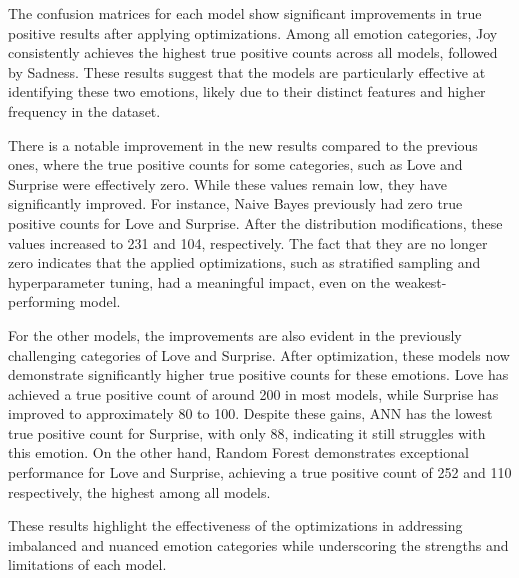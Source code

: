 The confusion matrices for each model show significant improvements in true positive results after applying optimizations. Among all emotion categories, Joy consistently achieves the highest true positive counts across all models, followed by Sadness. These results suggest that the models are particularly effective at identifying these two emotions, likely due to their distinct features and higher frequency in the dataset.

There is a notable improvement in the new results compared to the previous ones, where the true positive counts for some categories, such as Love and Surprise were effectively zero. While these values remain low, they have significantly improved. For instance, Naive Bayes previously had zero true positive counts for Love and Surprise. After the distribution modifications, these values increased to 231 and 104, respectively. The fact that they are no longer zero indicates that the applied optimizations, such as stratified sampling and hyperparameter tuning, had a meaningful impact, even on the weakest-performing model.

For the other models, the improvements are also evident in the previously challenging categories of Love and Surprise. After optimization, these models now demonstrate significantly higher true positive counts for these emotions. Love has achieved a true positive count of around 200 in most models, while Surprise has improved to approximately 80 to 100. Despite these gains, ANN has the lowest true positive count for Surprise, with only 88, indicating it still struggles with this emotion. On the other hand, Random Forest demonstrates exceptional performance for Love and Surprise, achieving a true positive count of 252 and 110 respectively, the highest among all models.

These results highlight the effectiveness of the optimizations in addressing imbalanced and nuanced emotion categories while underscoring the strengths and limitations of each model.

\clearpage



